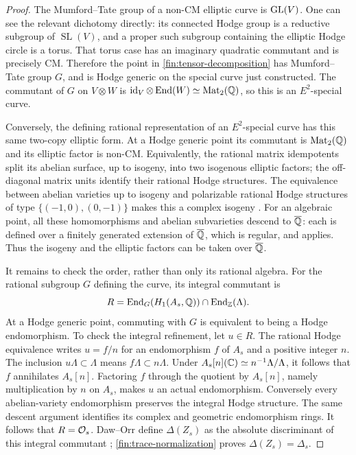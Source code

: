 \begin{proof}
The Mumford--Tate group of a non-CM elliptic curve is $\operatorname{GL}(V)$.
One can see the relevant dichotomy directly: its connected Hodge
group is a reductive subgroup of $\operatorname{SL}(V)$, and a proper such subgroup
containing the elliptic Hodge circle is a torus.  That torus case
has an imaginary quadratic commutant and is precisely CM.  Therefore
the point in \eqref{fin:tensor-decomposition} has Mumford--Tate
group $G$, and is Hodge generic on the special curve just constructed.
The commutant of $G$ on $V\otimes W$ is
$\operatorname{id}_V\otimes\operatorname{End}(W)\simeq\operatorname{Mat}_2(\mathbb Q)$, so this is an
$E^2$-special curve.

Conversely, the defining rational representation of an
$E^2$-special curve has this same two-copy elliptic form.  At a Hodge
generic point its commutant is $\operatorname{Mat}_2(\mathbb Q)$ and its elliptic factor
is non-CM.  Equivalently, the rational matrix idempotents split its
abelian surface, up to isogeny, into two isogenous elliptic factors;
the off-diagonal matrix units identify their rational Hodge
structures.  The equivalence between abelian varieties up to
isogeny and polarizable rational Hodge structures of type
$\{(-1,0),(0,-1)\}$ makes this a complex isogeny
\cite[Theorem~4.1]{MilneShimura1995}.
For an algebraic point, all these homomorphisms and abelian
subvarieties descend to $\overline{\mathbb Q}$: each is defined over a finitely
generated extension of $\overline{\mathbb Q}$, which is regular, and
\cite[Corollary~20.4]{MilneAV} applies.  Thus the isogeny and the
elliptic factors can be taken over $\overline{\mathbb Q}$.

It remains to check the order, rather than only its rational algebra.
For the rational subgroup $G$ defining the curve, its integral
commutant is
\begin{equation}\label{fin:integral-commutant}
 R=\operatorname{End}_G(H_1(A_s,\mathbb Q))\cap\operatorname{End}_{\mathbb Z}(\Lambda).
\end{equation}
At a Hodge generic point, commuting with $G$ is equivalent to being
a Hodge endomorphism.  To check the integral refinement, let
$u\in R$.  The rational Hodge equivalence writes $u=f/n$ for an
endomorphism $f$ of $A_s$ and a positive integer $n$.
The inclusion $u\Lambda\subset\Lambda$ means
$f\Lambda\subset n\Lambda$.  Under
$A_s[n](\mathbb C)\simeq n^{-1}\Lambda/\Lambda$, it follows that $f$
annihilates $A_s[n]$.  Factoring $f$ through the quotient by
$A_s[n]$, namely multiplication by $n$ on $A_s$, makes $u$ an
actual endomorphism.  Conversely every abelian-variety endomorphism
preserves the integral Hodge structure.
The same descent argument identifies its complex and geometric
endomorphism rings.  It follows that $R=\mathcal O_s$.
Daw--Orr define $\Delta(Z_s)$ as the absolute discriminant of this
integral commutant \cite[\S6.3]{DawOrr2022};
\eqref{fin:trace-normalization} proves $\Delta(Z_s)=\Delta_s$.
\end{proof}

